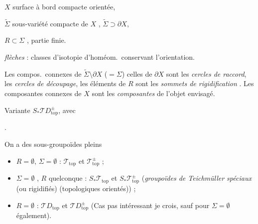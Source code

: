 \documentclass[11pt,a4paper]{article}
\begin{document}
\quad $X$ surface à bord compacte orientée,

\quad $\widetilde{\Sigma}$ sous-variété compacte de $X$ \struck{\ill{}},
$\widetilde{\Sigma} \supset \partial X$,

\quad \struck{\ill{}} $R \subset \Sigma$ \struck{\ill{}}, partie finie.

\emph{flèches} : classes d'isotopie d'homéom.\ conservant l'orientation.


 Les compos.\ connexes de
$\widetilde{\Sigma} \setminus \partial X$ ($= \Sigma$)  celles de
$\partial X$ sont les \emph{cercles de raccord}, les
\emph{cercles de découpage}, les éléments de $R$ sont les
\emph{sommets de rigidification} . Les composantes connexes de $X$ sont les \emph{composantes} de
l'objet envisagé.

Variante $S_{*}\mathcal{T}D^{\pm}_{\mathrm{top}}$, avec


\ill{} .

On a des sous-groupoïdes pleins
\begin{itemize}
  \item[] $R = \emptyset$, $\Sigma = \emptyset$ \struck{\ill{}} :
    $\mathcal{T}_{\mathrm{top}}$ et $\mathcal{T}^{\pm}_{\mathrm{top}}$ ;
  \item[] $\Sigma = \emptyset$ \struck{\ill{}}, $R$ quelconque :
    $S_{*}\mathcal{T}_{\mathrm{top}}$ et
    $S_{*}\mathcal{T}^{\pm}_{\mathrm{top}}$ (\emph{groupoïdes de Teichmüller
    spéciaux} (ou rigidifiés) (topologiques orientés)) ;
  \item[] $R = \emptyset$ : $\mathcal{T}D_{\mathrm{top}}$ et
    $\mathcal{T}D^{\pm}_{\mathrm{top}}$ (Cas pas intéressant je crois, sauf
    pour $\Sigma = \emptyset$ également).
\end{itemize}
\end{document}
